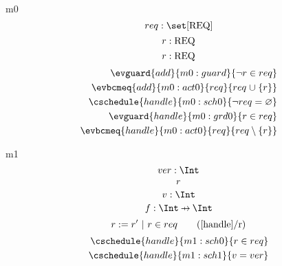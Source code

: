 \documentclass[12pt]{amsart}
\newcommand{\REQ}{\text{REQ}}
\begin{document}
  
\begin{machine}{m0}
  \newset{\REQ}
  \[ \variable{ req : \set [\REQ] } \]
  \[ \param{add}{ r : \REQ } \]
  \[ \param{handle}{ r : \REQ } \]
  \begin{align*}
      \evguard{add}{m0:guard}{ \neg r \in req } \\
      \evbcmeq{add}{m0:act0}{req}{ req \bunion \{ r \} } \\
      \cschedule{handle}{m0:sch0}{ \neg req = \emptyset } \\
      \evguard{handle}{m0:grd0}{ r \in req } \\
      \evbcmeq{handle}{m0:act0}{req}{ req \setminus \{ r \} } 
  \end{align*}

\noindent
\end{machine}

  
\begin{machine}{m1}
  \[ \variable{ ver : \Int } \]
  \[ \promote{handle}{r} \]
  \[ \indices{handle}{ v : \Int } \]
  \[ \constant{ f : \Int \pfun \Int } \]
  \[ \witness{handle}{r}{r \in req} \]
  \begin{align}
      \cschedule{handle}{m1:sch0}{ r \in req } \\
      \cschedule{handle}{m1:sch1}{ v = ver } 
  \end{align}
\end{machine}
\end{document}
